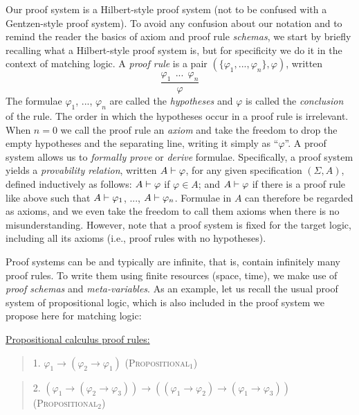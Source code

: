 \documentclass[UTF8,11pt]{article}
\theoremstyle{plain}
\theoremstyle{definition}
\theoremstyle{remark}
\newcommand{\ra}{\rightarrow}
\begin{document}
Our proof system is a Hilbert-style proof system (not to be confused with a
Gentzen-style proof system).
To avoid any confusion about our notation and to remind the reader the
basics of axiom and proof rule \emph{schemas}, we start by briefly recalling
what a Hilbert-style proof system is, but for specificity we do it in the
context of matching logic.
A \emph{proof rule} is a pair $(\{\varphi_1,...,\varphi_n\},\varphi)$,
written
$$
\frac{
\varphi_1 \ \ ... \ \ \varphi_n
}{\varphi}
$$
The formulae $\varphi_1$, ..., $\varphi_n$ are called the \emph{hypotheses}
and $\varphi$ is called the \emph{conclusion} of the rule.
The order in which the hypotheses occur in a proof rule is irrelevant.
When $n = 0$ we call the proof rule an \emph{axiom} and take the freedom to
drop the empty hypotheses and the separating line, writing it simply as
``$\varphi$''.
A proof system allows us to \emph{formally prove} or \emph{derive} formulae.
Specifically, a proof system yields a \emph{provability relation}, written
${A}\vdash{\varphi}$, for any given specification $(\Sigma,A)$, defined
inductively as follows:
${A}\vdash{\varphi}$ if $\varphi \in A$; and
${A}\vdash{\varphi}$ if there is a proof rule like above such that
${A}\vdash{\varphi_1}$, ..., ${A}\vdash{\varphi_n}$.
Formulae in $A$ can therefore be regarded as axioms, and we even take the
freedom to call them axioms when there is no misunderstanding.
However, note that a proof system is fixed for the target logic, including
all its axioms (i.e., proof rules with no hypotheses).

Proof systems can be and typically are infinite, that is, contain infinitely
many proof rules.
To write them using finite resources (space, time), we make use of \emph{proof schemas}
and \emph{meta-variables}.
As an example, let us recall the usual proof system of propositional logic,
which is also included in the proof system we propose here for matching logic:

\vspace*{2ex}

\noindent
\underline{Propositional calculus proof rules:}

\begin{quote}
1. $\varphi_1 \ra (\varphi_2 \ra \varphi_1)$
\hfill \textsc{(Propositional$_1$)}
\end{quote}

\begin{quote}
2. $(\varphi_1 \ra (\varphi_2 \ra \varphi_3)) \ra ((\varphi_1 \ra \varphi_2) \ra (\varphi_1 \ra \varphi_3))$
\hfill \textsc{(Propositional$_2$)}
\end{quote}
\end{document}
